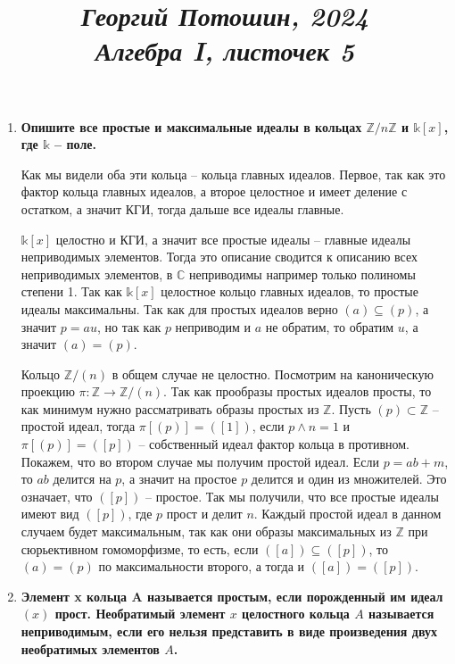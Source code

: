 \documentclass{article}
\title{
\textit{\small{Георгий Потошин, 2024}}\\
\vspace{0.3ex}
\textit{\huge{Алгебра I, листочек 5}}\vspace{1ex}
}
\date{\vspace{-10ex}}
\begin{document}
\maketitle

\begin{enumerate}
    \item \textbf{Опишите все простые и максимальные идеалы в кольцах $\mathbb{Z}
        /n\mathbb{Z}$ и $\mathbb{k}[x]$, где $\mathbb{k}$ – поле.}

        Как мы видели оба эти кольца – кольца главных идеалов. Первое, так
        как это фактор кольца главных идеалов, а второе целостное и имеет
        деление с остатком, а значит КГИ, тогда дальше все идеалы главные.

        $\mathbb{k}[x]$ целостно и КГИ, а значит все простые идеалы – главные
        идеалы неприводимых элементов. Тогда это описание сводится к описанию
        всех неприводимых элементов, в $\mathbb{C}$ неприводимы например только
        полиномы степени 1. Так как $\mathbb{k}[x]$ целостное кольцо главных
        идеалов, то простые идеалы максимальны. Так как для простых идеалов верно
        $(a)\subseteq(p)$, а значит $p=au$, но так как $p$ неприводим и
        $a$ не обратим, то обратим $u$, а значит $(a)=(p)$.

        Кольцо $\mathbb{Z}/(n)$ в общем случае не целостно. Посмотрим на
        каноническую проекцию $\pi:\mathbb{Z}\longrightarrow\mathbb{Z}/(n)$.
        Так как прообразы простых идеалов просты, то как минимум нужно
        рассматривать образы простых из $\mathbb{Z}$. Пусть $(p)\subset\mathbb{Z}$
        – простой идеал, тогда $\pi[(p)]=([1])$, если $p\wedge n=1$ и
        $\pi[(p)]=([p])$ – собственный идеал фактор кольца в противном. Покажем,
        что во втором случае мы получим простой идеал. Если $p=ab+m$, то $ab$
        делится на $p$, а значит на простое $p$ делится и один из множителей.
        Это означает, что $([p])$ – простое. Так мы получили, что все простые
        идеалы имеют вид $([p])$, где $p$ прост и делит $n$. Каждый простой
        идеал в данном случаем будет максимальным, так как они образы
        максимальных из $\mathbb{Z}$ при сюрьективном гомоморфизме, то есть,
        если $([a])\subseteq([p])$, то $(a)=(p)$ по максимальности второго, а
        тогда и $([a])=([p])$.

    \item \textbf{Элемент x кольца A называется простым, если порожденный им
        идеал $(x)$ прост. Необратимый элемент $x$ целостного кольца $A$
        называется неприводимым, если его нельзя представить в виде произведения
        двух необратимых элементов $A$.}


\end{enumerate}
\end{document}
